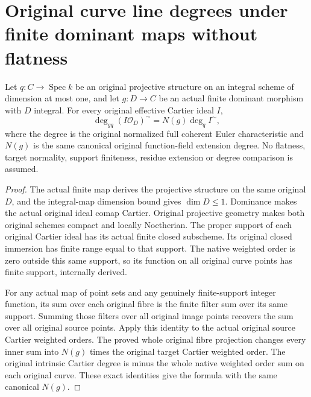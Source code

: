 \section{Original curve line degrees under finite dominant maps without flatness}

\begin{theorem}
\label{thm:intrinsic-numerical-nonflat-cartier-degree}
\leanok
Let $q:C\to\operatorname{Spec}k$ be an original projective structure on
an integral scheme of dimension at most one, and let $g:D\to C$ be an
actual finite dominant morphism with $D$ integral. For every original
effective Cartier ideal $I$,
\[
 \deg_{gq}(I\mathcal O_D)^{\sim}=N(g)\deg_q I^{\sim},
\]
where the degree is the original normalized full coherent Euler
characteristic and $N(g)$ is the same canonical original function-field
extension degree. No flatness, target normality, support finiteness,
residue extension or degree comparison is assumed.
\end{theorem}
\begin{proof}
The actual finite map derives the projective structure on the same
original $D$, and the integral-map dimension bound gives $\dim D\leq1$.
Dominance makes the actual original ideal comap Cartier. Original
projective geometry makes both original schemes compact and locally
Noetherian. The proper support of each original Cartier ideal has its
actual finite closed subscheme. Its original closed immersion has finite
range equal to that support. The native weighted order is zero outside
this same support, so its function on all original curve points has
finite support, internally derived.

For any actual map of point sets and any genuinely finite-support
integer function, its sum over each original fibre is the finite filter
sum over its same support. Summing those filters over all original
image points recovers the sum over all original source points. Apply
this identity to the actual original source Cartier weighted orders.
The proved whole original fibre projection changes every inner sum
into $N(g)$ times the original target Cartier weighted order. The
original intrinsic Cartier degree is minus the whole native weighted
order sum on each original curve. These exact identities give the
formula with the same canonical $N(g)$.
\end{proof}

